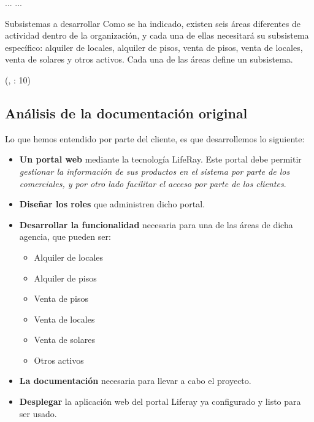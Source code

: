 \begin{center}
\begin{minipage}{0.9\linewidth}
{        ...
        ...

        Subsistemas a desarrollar
        Como se ha indicado, existen seis áreas diferentes de actividad dentro de la
        organización, y cada una de ellas necesitará su subsistema específico: alquiler de
        locales, alquiler de pisos, venta de pisos, venta de locales, venta de solares y otros
        activos. Cada una de las áreas define un subsistema.
        }
        \begin{flushright}
            (\citeauthor{WEB:Enunciado}, : 10)
        \end{flushright}
        \vspace{5pt}%
    \end{minipage}
\end{center}



\subsection{Análisis de la documentación original}
\par Lo que hemos entendido por parte del cliente, es que desarrollemos lo siguiente:
\begin{itemize}
	\item \textbf{Un portal web} mediante la tecnología LifeRay. Este portal debe permitir \textit{gestionar la información de sus productos en el sistema por parte de los
comerciales, y por otro lado facilitar el acceso por parte de los clientes}.
	\item \textbf{Diseñar los roles} que administren dicho portal.
	\item \textbf{Desarrollar la funcionalidad} necesaria para una de las áreas de dicha agencia, que pueden ser:
	\begin{itemize}
	 	\item Alquiler de locales
	 	\item Alquiler de pisos
	 	\item Venta de pisos
	 	\item Venta de locales
	 	\item Venta de solares
	 	\item Otros activos
	 \end{itemize}
	 \item \textbf{La documentación} necesaria para llevar a cabo el proyecto.
	 \item \textbf{Desplegar} la aplicación web del portal Liferay ya configurado y listo para ser usado.
\end{itemize}
